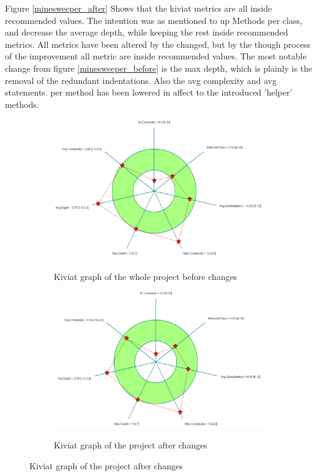 \documentclass[UKenglish]{article}  %
\begin{document}
Figure \ref{minesweeper_after} Shows that the kiviat metrics are all inside 
recommended values. The intention was as mentioned to up Methods per class, and decrease
the average depth, while keeping the rest inside recommended metrics. All
metrics have been altered by the changed, but by the though process of the
improvement all metric are inside recommended values. The most notable change
from figure \ref{minesweeper_before} is the max depth, which is plainly is the
removal of the redundant indentations. Also the avg complexity and avg 
statements.
per method has been lowered in affect to the introduced 'helper' methods. 

\begin{figure}[h]
	\begin{subfigure}[b]{0.5\textwidth}
		\caption{Kiviat graph of the whole project before changes}
		\includegraphics[width=\textwidth]{kiviat_project_baseline}
		\label{project_before}
	\end{subfigure}
	\begin{subfigure}[b]{0.5\textwidth}
		\caption{Kiviat graph of the project after changes}
		\includegraphics[width=\textwidth]{kiviat_project_after}
		\label{project_after}
	\end{subfigure}
\end{figure}
\end{document}
